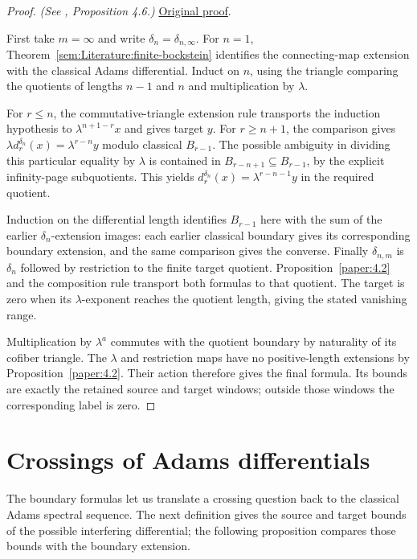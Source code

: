 \begin{proof}
\textit{(See \cite{LWX126}, Proposition 4.6.)} \href{paper/main.tex.html#L1087}{Original proof}.

First take $m=\infty$ and write $\delta_n=\delta_{n,\infty}$. For $n=1$, Theorem~\ref{sem:Literature:finite-bockstein} identifies the connecting-map extension with the classical Adams differential. Induct on $n$, using the triangle comparing the quotients of lengths $n-1$ and $n$ and multiplication by $\lambda$.

For $r\le n$, the commutative-triangle extension rule transports the induction hypothesis to $\lambda^{n+1-r}x$ and gives target $y$. For $r\ge n+1$, the comparison gives $\lambda d_r^{\delta_n}(x)=\lambda^{r-n}y$ modulo classical $B_{r-1}$. The possible ambiguity in dividing this particular equality by $\lambda$ is contained in $B_{r-n+1}\subseteq B_{r-1}$, by the explicit infinity-page subquotients. This yields $d_r^{\delta_n}(x)=\lambda^{r-n-1}y$ in the required quotient.

Induction on the differential length identifies $B_{r-1}$ here with the sum of the earlier $\delta_n$-extension images: each earlier classical boundary gives its corresponding boundary extension, and the same comparison gives the converse. Finally $\delta_{n,m}$ is $\delta_n$ followed by restriction to the finite target quotient. Proposition~\ref{paper:4.2} and the composition rule transport both formulas to that quotient. The target is zero when its $\lambda$-exponent reaches the quotient length, giving the stated vanishing range.

Multiplication by $\lambda^a$ commutes with the quotient boundary by
naturality of its cofiber triangle. The $\lambda$ and restriction maps
have no positive-length extensions by Proposition~\ref{paper:4.2}.
Their action therefore gives the final formula. Its bounds are exactly
the retained source and target windows; outside those windows the
corresponding label is zero.
\end{proof}



\section{Crossings of Adams differentials}

The boundary formulas let us translate a crossing question back to
the classical Adams spectral sequence. The next definition gives the
source and target bounds of the possible interfering differential;
the following proposition compares those bounds with the boundary
extension.

